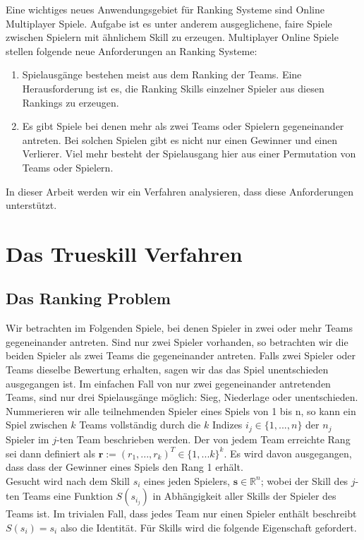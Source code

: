 \documentclass[12pt,a4paper]{scrartcl}
\numberwithin{equation}{section}
\newcommand{\R}{\mathbb{R}} %
\begin{document}
Eine wichtiges neues Anwendungsgebiet für Ranking Systeme sind Online Multiplayer Spiele. Aufgabe ist es unter anderem ausgeglichene, faire Spiele zwischen Spielern mit ähnlichem
Skill zu erzeugen. Multiplayer Online Spiele stellen folgende neue Anforderungen an Ranking Systeme:

\begin{enumerate}
 \item Spielausgänge bestehen meist aus dem Ranking der Teams. Eine Herausforderung ist es, die Ranking Skills einzelner Spieler aus diesen Rankings zu erzeugen.
 \item Es gibt Spiele bei denen mehr als zwei Teams oder Spielern gegeneinander antreten. Bei solchen Spielen gibt es nicht nur einen Gewinner und einen Verlierer. Viel mehr besteht der Spielausgang
 hier aus einer Permutation von Teams oder Spielern. 
\end{enumerate}

In dieser Arbeit werden wir ein Verfahren analysieren, dass diese Anforderungen unterstützt.

 \newpage  %
\section{Das Trueskill Verfahren}

\subsection{Das Ranking Problem}

Wir betrachten im Folgenden Spiele, bei denen Spieler in zwei oder mehr Teams gegeneinander antreten. Sind nur zwei Spieler vorhanden, so betrachten wir die beiden Spieler als zwei Teams
die gegeneinander antreten. Falls zwei Spieler oder Teams dieselbe Bewertung erhalten, sagen wir das das Spiel unentschieden ausgegangen ist. 
Im einfachen Fall von nur zwei gegeneinander antretenden Teams, sind nur drei Spielausgänge möglich: Sieg, Niederlage oder unentschieden. \\
Nummerieren wir alle teilnehmenden Spieler eines Spiels von 1 bis n, so kann ein Spiel zwischen $k$ Teams vollständig durch die $k$ Indizes $i_{j} \in \{ 1,...,n \} $ der $n_{j}$ Spieler
im $j$-ten Team beschrieben werden. Der von jedem Team erreichte Rang sei dann definiert als $\textbf{r}:= (r_{1},...,r_{k})^T \in \{ 1,...k \}^{k}$. Es wird davon ausgegangen, dass
dass der Gewinner eines Spiels den Rang 1 erhält. \\
Gesucht wird nach dem Skill $s_{i}$ eines jeden Spielers, $\textbf{s} \in \R^{n}$; wobei der Skill des $j$-ten Teams eine Funktion $S(s_{i_j})$ in Abhängigkeit aller Skills
der Spieler des Teams ist. Im trivialen Fall, dass jedes Team nur einen Spieler enthält beschreibt $S(s_{i}) = s_{i}$ also die Identität.
Für Skills wird die folgende Eigenschaft gefordert. 
\end{document}
